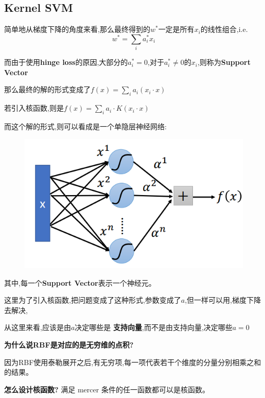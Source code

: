 \documentclass[UTF8,a4paper]{ctexart}
\begin{document}
        \subsection{Kernel SVM}
        简单地从梯度下降的角度来看,那么最终得到的$w^*$一定是所有$x_i$的线性组合,i.e.
        \begin{equation}
            w^* = \sum_i a_i^* x_i
        \end{equation}

        而由于使用\textbf{hinge loss}的原因,大部分的$a_i^* = 0$,对于$a_i^* \neq 0$的$x_i$,则称为\textbf{Support Vector}

        那么最终的解的形式变成了$f(x) = \sum_i a_i(x_i\cdot x)$

         若引入核函数,则是$f(x) = \sum_i a_i\cdot K(x_i\cdot x)$

        而这个解的形式,则可以看成是一个单隐层神经网络:

        \begin{figure}[H]
            \centering
            \includegraphics[scale = 0.3]{assets/ML_b1b86.png}
        \end{figure}

        其中,每一个\textbf{Support Vector}表示一个神经元。

        {\color{blue} 这里为了引入核函数,把问题变成了这种形式,参数变成了$a$,但一样可以用,梯度下降去解决,

        从这里来看,应该是由$a$决定哪些是 \textbf{支持向量},而不是由支持向量,决定哪些$a = 0$}

        \textbf{为什么说RBF是对应的是无穷维的点积?}

        因为RBF使用泰勒展开之后,有无穷项,每一项代表若干个维度的分量分别相乘之和的结果。

        \textbf{怎么设计核函数?}
        满足 mercer 条件的任一函数都可以是核函数。
\end{document}
